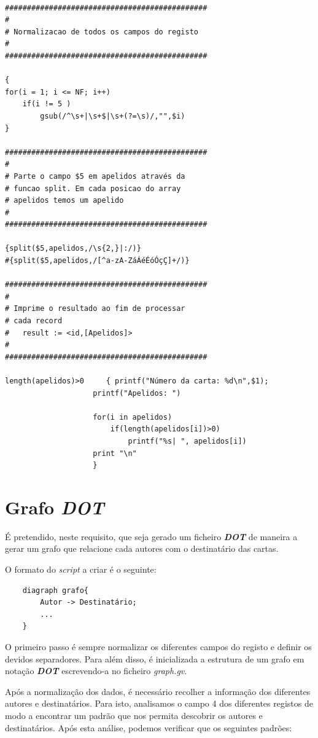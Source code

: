 \documentclass[11pt,a4paper]{report}
\begin{document}
\begin{verbatim}

##############################################
#
# Normalizacao de todos os campos do registo 
#
##############################################

{
for(i = 1; i <= NF; i++)
	if(i != 5 )
      	gsub(/^\s+|\s+$|\s+(?=\s)/,"",$i)
}

##############################################
#
# Parte o campo $5 em apelidos através da 
# funcao split. Em cada posicao do array
# apelidos temos um apelido
#
##############################################

{split($5,apelidos,/\s{2,}|:/)}
#{split($5,apelidos,/[^a-zA-ZáÁéÉóÓçÇ]+/)}

##############################################
#
# Imprime o resultado ao fim de processar 
# cada record
#	result := <id,[Apelidos]>
#
##############################################

length(apelidos)>0	   { printf("Número da carta: %d\n",$1);	
					printf("Apelidos: ")
					
					for(i in apelidos) 
						if(length(apelidos[i])>0)
							printf("%s| ", apelidos[i])
					print "\n" 
					}

\end{verbatim}

\section{Grafo \textit{DOT}}

\qquad É pretendido, neste requisito, que seja gerado um ficheiro \textbf{\textit{DOT}} de maneira a gerar um grafo que relacione cada autores com o destinatário das cartas.

\quad O formato do \textit{script} a criar é o seguinte:

\begin{verbatim}
    diagraph grafo{
        Autor -> Destinatário;
        ...
    }
\end{verbatim}

\quad O primeiro passo é sempre normalizar os diferentes campos do registo e definir os devidos separadores. Para além disso, é inicializada a estrutura de um grafo em notação \textbf{\textit{DOT}} escrevendo-a no ficheiro \textit{graph.gv}.

\quad Após a normalização dos dados, é necessário recolher a informação dos diferentes autores e destinatários. Para isto, analisamos o campo 4 dos diferentes registos de modo a encontrar um padrão que nos permita descobrir os autores e destinatários. Após esta análise, podemos verificar que os seguintes padrões: 
\end{document}
